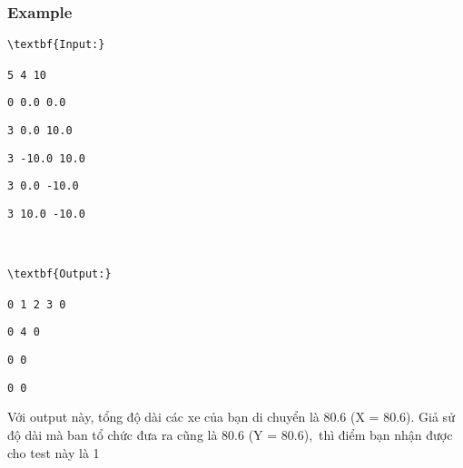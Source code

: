 \subsubsection{Example}
\begin{verbatim}
\textbf{Input:}

5 4 10\end{verbatim}
\begin{verbatim}
0 0.0 0.0\end{verbatim}
\begin{verbatim}
3 0.0 10.0\end{verbatim}
\begin{verbatim}
3 -10.0 10.0\end{verbatim}
\begin{verbatim}
3 0.0 -10.0\end{verbatim}
\begin{verbatim}
3 10.0 -10.0



\textbf{Output:}

0 1 2 3 0\end{verbatim}
\begin{verbatim}
0 4 0\end{verbatim}
\begin{verbatim}
0 0\end{verbatim}
\begin{verbatim}
0 0\end{verbatim}

Với output này, tổng độ dài các xe của bạn di chuyển là 80.6 (X = 80.6). Giả sử độ dài mà ban tổ chức đưa ra cũng là 80.6 (Y = 80.6), thì điểm bạn nhận được cho test này là 1

